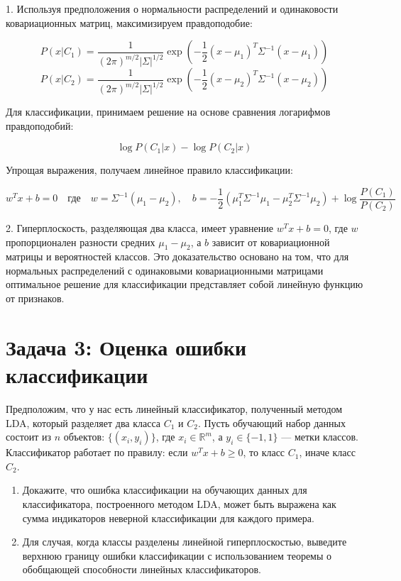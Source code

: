 1. Используя предположения о нормальности распределений и одинаковости ковариационных матриц, максимизируем правдоподобие:

   \[
   P(x | C_1) = \frac{1}{(2\pi)^{m/2} |\Sigma|^{1/2}} \exp\left(-\frac{1}{2} (x - \mu_1)^T \Sigma^{-1} (x - \mu_1)\right)
   \]
   \[
   P(x | C_2) = \frac{1}{(2\pi)^{m/2} |\Sigma|^{1/2}} \exp\left(-\frac{1}{2} (x - \mu_2)^T \Sigma^{-1} (x - \mu_2)\right)
   \]

   Для классификации, принимаем решение на основе сравнения логарифмов правдоподобий:

   \[
   \log P(C_1 | x) - \log P(C_2 | x)
   \]

   Упрощая выражения, получаем линейное правило классификации:

   \[
   w^T x + b = 0 \quad \text{где} \quad w = \Sigma^{-1} (\mu_1 - \mu_2), \quad b = -\frac{1}{2} (\mu_1^T \Sigma^{-1} \mu_1 - \mu_2^T \Sigma^{-1} \mu_2) + \log \frac{P(C_1)}{P(C_2)}
   \]

2. Гиперплоскость, разделяющая два класса, имеет уравнение \( w^T x + b = 0 \), где \( w \) пропорционален разности средних \( \mu_1 - \mu_2 \), а \( b \) зависит от ковариационной матрицы и вероятностей классов. Это доказательство основано на том, что для нормальных распределений с одинаковыми ковариационными матрицами оптимальное решение для классификации представляет собой линейную функцию от признаков.

\section*{Задача 3: Оценка ошибки классификации}

Предположим, что у нас есть линейный классификатор, полученный методом LDA, который разделяет два класса \( C_1 \) и \( C_2 \). Пусть обучающий набор данных состоит из \( n \) объектов: \( \{(x_i, y_i)\} \), где \( x_i \in \mathbb{R}^m \), а \( y_i \in \{-1, 1\} \) — метки классов. Классификатор работает по правилу: если \( w^T x + b \geq 0 \), то класс \( C_1 \), иначе класс \( C_2 \).

\begin{enumerate}
    \item Докажите, что ошибка классификации на обучающих данных для классификатора, построенного методом LDA, может быть выражена как сумма индикаторов неверной классификации для каждого примера.
    \item Для случая, когда классы разделены линейной гиперплоскостью, выведите верхнюю границу ошибки классификации с использованием теоремы о обобщающей способности линейных классификаторов.
\end{enumerate}


